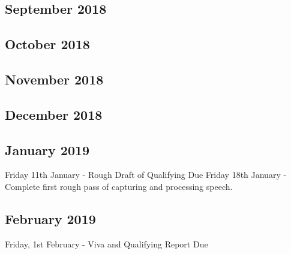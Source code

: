 \documentclass{article}
\begin{document}
	\subsection{September 2018}
	
	\subsection{October 2018}

	\subsection{November 2018}
	
	\subsection{December 2018}	
	
	\subsection{January 2019}
	Friday 11th January - Rough Draft of Qualifying Due
	Friday 18th January - Complete first rough pass of capturing and processing speech.
	
	\subsection{February 2019}
	Friday, 1st February - Viva and Qualifying Report Due
\end{document}
